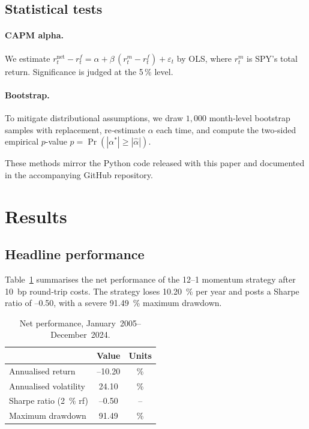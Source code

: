 \documentclass[11pt]{article}
\begin{document}
\subsection{Statistical tests}

\paragraph{CAPM alpha.}
We estimate
\(
r^{\text{net}}_t - r^f_t
  = \alpha + \beta\,(r^{m}_t - r^f_t) + \varepsilon_t
\)
by OLS, where \(r^{m}_t\) is SPY’s total return.  
Significance is judged at the 5 \% level.

\paragraph{Bootstrap.}
To mitigate distributional assumptions, we draw \(1{,}000\) month‑level bootstrap samples with replacement, re‑estimate \(\alpha\) each time, and compute the two‑sided empirical \(p\)-value
\(
p = \Pr(|\alpha^{*}| \ge |\hat{\alpha}|).
\)

These methods mirror the Python code released with this paper and documented in the accompanying GitHub repository.

\section{Results} \label{sec:results}

\subsection{Headline performance}

Table~\ref{tab:perf} summarises the net performance of the 12--1 momentum strategy after 10~bp round‑trip costs.  
The strategy loses 10.20~\% per year and posts a Sharpe ratio of --0.50, with a severe 91.49~\% maximum drawdown.

\begin{table}[h!]
  \centering
  \begin{tabular}{lcc}
    \toprule
    & \textbf{Value} & \textbf{Units} \\ \midrule
    Annualised return      & --10.20 & \% \\[2pt]
    Annualised volatility  & 24.10   & \% \\[2pt]
    Sharpe ratio (2~\% rf) & --0.50  & -- \\[2pt]
    Maximum drawdown       & 91.49   & \% \\ \bottomrule
  \end{tabular}
  \caption{Net performance, January~2005--December~2024.}
  \label{tab:perf}
\end{table}
\end{document}
